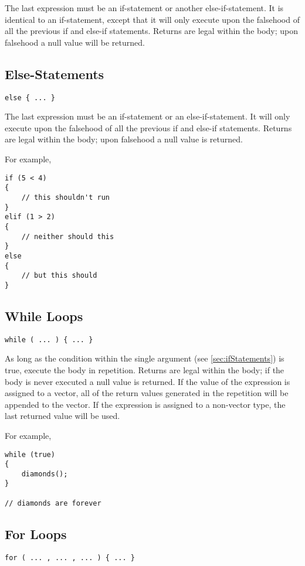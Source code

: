 \documentclass[10pt,a4paper]{article}
\begin{document}
The last expression must be an if-statement or another else-if-statement. It is identical to an if-statement, except that it will only execute upon the falsehood of all the previous if and else-if statements. Returns are legal within the body; upon falsehood a null value will be returned.

\subsection{Else-Statements}
\begin{verbatim}
else { ... }
\end{verbatim}

The last expression must be an if-statement or an else-if-statement. It will only execute upon the falsehood of all the previous if and else-if statements. Returns are legal within the body; upon falsehood a null value is returned.

For example,
\begin{verbatim}
if (5 < 4)
{
    // this shouldn't run
}
elif (1 > 2)
{
    // neither should this
}
else
{
    // but this should
}
\end{verbatim}

\subsection{While Loops}
\label{sec:whileLoops}
\begin{verbatim}
while ( ... ) { ... }
\end{verbatim}

As long as the condition within the single argument (see \ref{sec:ifStatements}) is true, execute the body in repetition. Returns are legal within the body; if the body is never executed a null value is returned. If the value of the expression is assigned to a vector, all of the return values generated in the repetition will be appended to the vector. If the expression is assigned to a non-vector type, the last returned value will be used.

For example,
\begin{verbatim}
while (true)
{
    diamonds();
}

// diamonds are forever
\end{verbatim}

\subsection{For Loops}
\begin{verbatim}
for ( ... , ... , ... ) { ... }
\end{verbatim}
\end{document}
